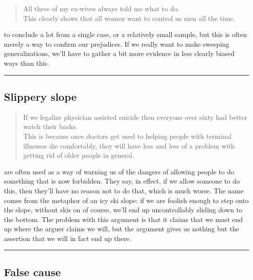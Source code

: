 \documentclass[justified]{tufte-book}
\newenvironment{argument}{\begin{quote}\normalsize}{\end{quote}}
\begin{document}
\begin{argument}
All three of my ex-wives always told me what to do.\\
This clearly shows that all women want to control us men all the time.
\end{argument}

 to conclude a lot from a single case, or a relatively small sample, but this is often merely a way to confirm our prejudices. If we really want to make sweeping generalizations, we'll have to gather a bit more evidence in less clearly biased ways than this.

\begin{center}\rule{0.5\linewidth}{\linethickness}\end{center}

\hypertarget{slippery-slope}{%
\subsection*{Slippery slope}\label{slippery-slope}}

\begin{argument}
If we legalize physician assisted suicide then everyone over sixty had
better watch their backs.\\
This is because once doctors get used to helping people with terminal
illnesses die comfortably, they will have less and less of a problem
with getting rid of older people in general.
\end{argument}

 are often used as a way of warning us of the dangers of allowing people to do something that is now forbidden. They say, in effect, if we allow someone to do this, then they'll have no reason not to do that, which is much worse. The name comes from the metaphor of an icy ski slope: if we are foolish enough to step onto the slope, without skis on of course, we'll end up uncontrollably sliding down to the bottom. The problem with this argument is that it claims that we must end up where the arguer claims we will, but the argument gives us nothing but the assertion that we will in fact end up there.

\begin{center}\rule{0.5\linewidth}{\linethickness}\end{center}

\hypertarget{false-cause}{%
\subsection*{False cause}\label{false-cause}}
\end{document}
